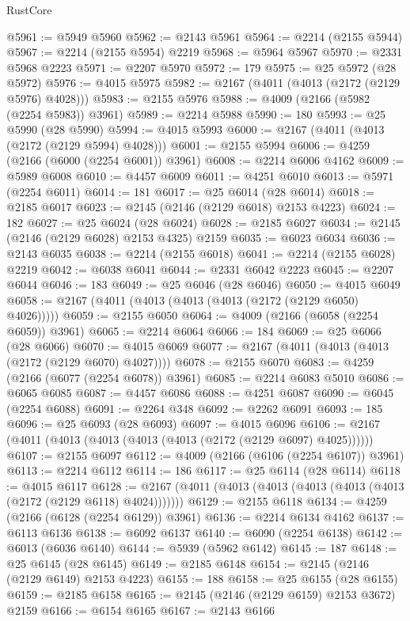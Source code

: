\begin{lexlean}{RustCore}
\begin{coremodule}
@5961 := @5949 @5960
@5962 := @2143 @5961
@5964 := @2214 (@2155 @5944)
@5967 := @2214 (@2155 @5954) @2219
@5968 := @5964 @5967
@5970 := @2331 @5968 @2223
@5971 := @2207 @5970
@5972 := 179
@5975 := @25 @5972 (@28 @5972)
@5976 := @4015 @5975
@5982 := @2167 (@4011 (@4013 (@2172 (@2129 @5976) @4028)))
@5983 := @2155 @5976
@5988 := @4009 (@2166 (@5982 (@2254 @5983)) @3961)
@5989 := @2214 @5988
@5990 := 180
@5993 := @25 @5990 (@28 @5990)
@5994 := @4015 @5993
@6000 := @2167 (@4011 (@4013 (@2172 (@2129 @5994) @4028)))
@6001 := @2155 @5994
@6006 := @4259 (@2166 (@6000 (@2254 @6001)) @3961)
@6008 := @2214 @6006 @4162
@6009 := @5989 @6008
@6010 := @4457 @6009
@6011 := @4251 @6010
@6013 := @5971 (@2254 @6011)
@6014 := 181
@6017 := @25 @6014 (@28 @6014)
@6018 := @2185 @6017
@6023 := @2145 (@2146 (@2129 @6018) @2153 @4223)
@6024 := 182
@6027 := @25 @6024 (@28 @6024)
@6028 := @2185 @6027
@6034 := @2145 (@2146 (@2129 @6028) @2153 @4325) @2159
@6035 := @6023 @6034
@6036 := @2143 @6035
@6038 := @2214 (@2155 @6018)
@6041 := @2214 (@2155 @6028) @2219
@6042 := @6038 @6041
@6044 := @2331 @6042 @2223
@6045 := @2207 @6044
@6046 := 183
@6049 := @25 @6046 (@28 @6046)
@6050 := @4015 @6049
@6058 := @2167 (@4011 (@4013 (@4013 (@4013 (@2172 (@2129 @6050) @4026)))))
@6059 := @2155 @6050
@6064 := @4009 (@2166 (@6058 (@2254 @6059)) @3961)
@6065 := @2214 @6064
@6066 := 184
@6069 := @25 @6066 (@28 @6066)
@6070 := @4015 @6069
@6077 := @2167 (@4011 (@4013 (@4013 (@2172 (@2129 @6070) @4027))))
@6078 := @2155 @6070
@6083 := @4259 (@2166 (@6077 (@2254 @6078)) @3961)
@6085 := @2214 @6083 @5010
@6086 := @6065 @6085
@6087 := @4457 @6086
@6088 := @4251 @6087
@6090 := @6045 (@2254 @6088)
@6091 := @2264 @348
@6092 := @2262 @6091
@6093 := 185
@6096 := @25 @6093 (@28 @6093)
@6097 := @4015 @6096
@6106 := @2167 (@4011 (@4013 (@4013 (@4013 (@4013 (@2172 (@2129 @6097) @4025))))))
@6107 := @2155 @6097
@6112 := @4009 (@2166 (@6106 (@2254 @6107)) @3961)
@6113 := @2214 @6112
@6114 := 186
@6117 := @25 @6114 (@28 @6114)
@6118 := @4015 @6117
@6128 := @2167 (@4011 (@4013 (@4013 (@4013 (@4013 (@4013 (@2172 (@2129 @6118) @4024)))))))
@6129 := @2155 @6118
@6134 := @4259 (@2166 (@6128 (@2254 @6129)) @3961)
@6136 := @2214 @6134 @4162
@6137 := @6113 @6136
@6138 := @6092 @6137
@6140 := @6090 (@2254 @6138)
@6142 := @6013 (@6036 @6140)
@6144 := @5939 (@5962 @6142)
@6145 := 187
@6148 := @25 @6145 (@28 @6145)
@6149 := @2185 @6148
@6154 := @2145 (@2146 (@2129 @6149) @2153 @4223)
@6155 := 188
@6158 := @25 @6155 (@28 @6155)
@6159 := @2185 @6158
@6165 := @2145 (@2146 (@2129 @6159) @2153 @3672) @2159
@6166 := @6154 @6165
@6167 := @2143 @6166

\end{coremodule}
\end{lexlean}
